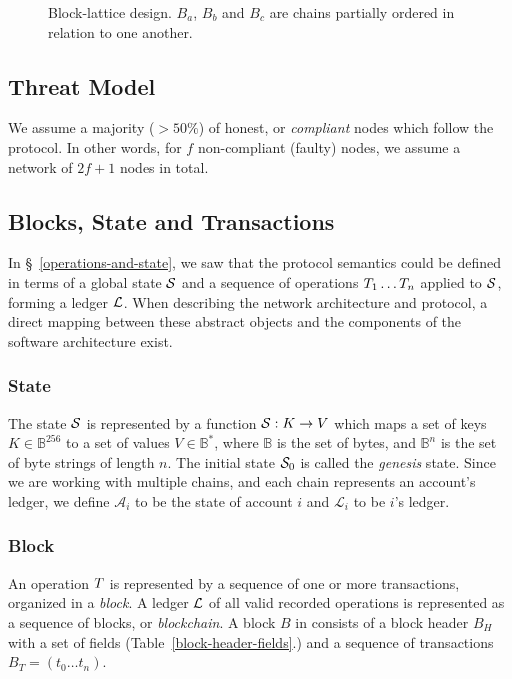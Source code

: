 \begin{figure}[!ht]
    
    \caption{Block-lattice design. $B_a$, $B_b$ and $B_c$ are chains partially ordered in relation to one another.\label{block-lattice}}
\end{figure}

\subsection{Threat Model}

We assume a majority ($> 50\%$) of honest, or \emph{compliant} nodes which follow
the protocol. In other words, for $f$ non-compliant (faulty) nodes, we assume a
network of $2f+1$ nodes in total.

\subsection{Blocks, State and Transactions}

In \S~\ref{operations-and-state}, we saw that the protocol semantics could
be defined in terms of a global state $\mathcal{S}$ and a sequence of operations
$T_1 \dotso T_n$ applied to $\mathcal{S}$, forming a ledger $\mathcal{L}$. When
describing the network architecture and protocol, a direct mapping between
these abstract objects and the components of the software architecture exist.

\subsubsection{State}

The state $\mathcal{S}$ is represented by a function $\mathcal{S} : K \to V$ which maps a
set of keys $K \in \mathbb{B}^{256}$ to a set of values $V \in \mathbb{B}^{*}$,
where $\mathbb{B}$ is the set of bytes, and $\mathbb{B}^n$ is the set of byte
strings of length $n$. The initial state $\mathcal{S}_0$ is called the
\emph{genesis} state. Since we are working with multiple chains, and each
chain represents an account's ledger, we define $\mathcal{A}_i$ to be the state
of account $i$ and $\mathcal{L}_i$ to be $i$'s ledger.

\subsubsection{Block}

An operation $T$ is represented by a sequence of one or more transactions,
organized in a \emph{block}. A ledger $\mathcal{L}$ of all valid recorded
operations is represented as a sequence of blocks, or \emph{blockchain}. A
block $B$ in \oscoin{} consists of a block header $B_H$ with a set of fields
(Table~\ref{block-header-fields}.) and a sequence of transactions $B_T = (t_0
\dotso t_n)$.

